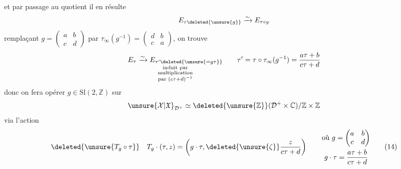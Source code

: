 et par passage au quotient il en résulte
\[
E_{\tau\deleted{\unsure{g}}}\xrightarrow{\sim}E_{\tau\circ g}
\]
remplaçant $g=\begin{pmatrix}a&b\\c&d\end{pmatrix}$ par
$\tau_\infty(g^{-1})=\begin{pmatrix}d&b\\c&a\end{pmatrix}$, on trouve
\[
\underset{\substack{\text{induit par}\\\text{multiplication}\\
\text{par }(c\tau+d)^{-1}}}
{E_\tau\xrightarrow{\sim}E_{\tau'\deleted{\unsure{=g\tau}}}}
\qquad
\tau'=\tau\circ\tau_\infty(g^{-1})=\frac{a\tau+b}{c\tau+d}
\]
donc on fera opérer $g\in\mathrm{Sl}(2,\mathbb Z)$  sur
\[
\unsure{\mathcal X|\mathfrak X}_{\mathcal D^+}\simeq\deleted{\unsure{\mathbb Z}}
(\mathcal D^+\times\mathbb C)/\mathbb Z\times\mathbb Z
\]
via l'action
\begin{equation}
\deleted{\unsure{T_g\circ\tau}}\quad
T_g\cdot(\tau,z)=\left(g\cdot\tau,\deleted{\unsure{\zeta}}\frac{z}{c\tau+d}\right)
\qquad
\begin{gathered}
\text{où }g=\begin{pmatrix}a&b\\c&d\end{pmatrix}\\
g\cdot\tau=\frac{a\tau+b}{c\tau+d}
\end{gathered}
\tag{14}
\end{equation}

